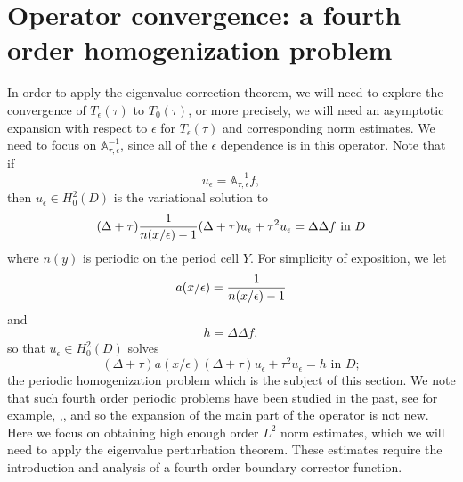 \documentclass[12pt]{article}
\begin{document}
\section{Operator convergence: a fourth order homogenization problem}\label{sec3}
In order to apply the eigenvalue correction theorem, we will need to explore the convergence of $T_\epsilon(\tau)$ to $T_0(\tau)$, or more precisely, we will need an asymptotic expansion  with respect to $\epsilon$ for $T_\epsilon(\tau)$ and corresponding norm estimates. We need to focus on $ \mathbb{A}_{\tau,\epsilon}^{-1}$, since all of the $\epsilon$ dependence is in this operator. Note that if $$u_\epsilon = \mathbb{A}_{\tau,\epsilon}^{-1} f, $$
then  $u_\epsilon\in H^2_0(D)$ is  the variational solution to  
\begin{equation} \label{eq:uepsn} (\Delta +\tau ) {1\over{n(x/\epsilon) -1}}(\Delta +\tau )u_\epsilon +\tau^2 u_\epsilon = \Delta\Delta f \mbox{ in } D \end{equation}
where $n(y)$ is periodic on the period cell $Y$.  For simplicity of exposition, we let 
\begin{equation} \label{eq:a} a(x/\epsilon) = {1\over{n(x/\epsilon) -1}}  \end{equation}
and $$h= \Delta \Delta f ,$$
so that $u_\epsilon\in H^2_0(D)$ solves 
\begin{equation} \label{eq:uepsa} (\Delta +\tau ) a(x/\epsilon) (\Delta +\tau )u_\epsilon +\tau^2 u_\epsilon = h\mbox{ in } D ;\end{equation}
 the periodic homogenization problem which is the subject of this section.  We note that such fourth order periodic problems have been studied in the past, see for example, \cite{Pa},\cite{Fr},   and so the expansion of the main part of the operator is not new. Here we focus on obtaining high enough order $L^2$ norm estimates, which we will need to apply the eigenvalue perturbation theorem. These estimates require the introduction and analysis of a fourth order boundary corrector function. 
\end{document}
